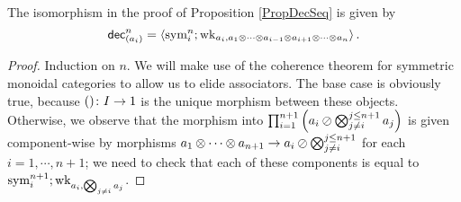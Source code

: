\begin{proposition}
  The isomorphism in the proof of Proposition \ref{PropDecSeq} is given by
  \[
    \operatorname{{\mathsf{dec}}}_{(a_i)}^n = \langle \operatorname{sym}_i^{n};\operatorname{wk}_{a_i,a_1\otimes\cdots\otimes a_{i-1}\otimes a_{i+1}\otimes \cdots\otimes a_n}\rangle\,.
    \]
  \label{PropDecSeqFormula}
\end{proposition}
\begin{proof}
  Induction on $n$.
  We will make use of the coherence theorem for symmetric monoidal categories \cite[]{WorkingMathematician} to allow us to elide associators.  
  The base case is obviously true, because $()\colon I \to 1$ is the unique morphism between these objects.  
  Otherwise, we observe that the morphism into $\prod_{i=1}^{n+1} \left(a_i \oslash \bigotimes_{j\ne i}^{j\le n+1} a_j\right)$ is given component-wise by morphisms $a_1 \otimes \cdots \otimes a_{n+1} \to a_i \oslash \bigotimes_{j\ne i}^{j\le n+1}$ for each $i=1,\cdots,n+1$; we need to check that each of these components is equal to $\operatorname{sym}_i^{n+1};\operatorname{wk}_{a_i,\bigotimes_{j\ne i}a_j}$.


\end{proof}
